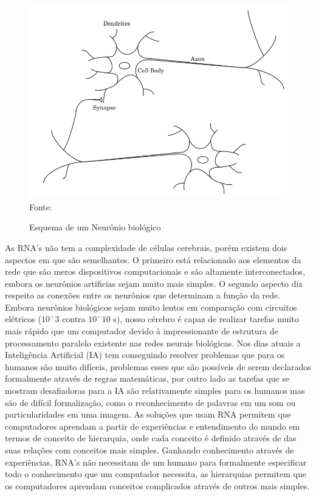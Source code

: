 \documentclass[
	12pt,				%
    oneside,			%
	a4paper,			%
	english,			%
	french,				%
	spanish,			%
	brazil,				%
	]{abntex2}
\begin{document}
\begin{figure}[h]
    \centering
    \caption{Esquema de um Neurônio biológico}
    \includegraphics[width=\textwidth]{Neuronio}
    Fonte: \hfill
    \label{fig:figuraneuronio}
\end{figure}

As RNA's não tem a complexidade de células cerebrais, porém existem dois aspectos em que são semelhantes. O primeiro está relacionado aos elementos da rede que são meros dispositivos computacionais e são altamente interconectados, embora os neurônios artificias sejam muito mais simples. O segundo aspecto diz respeito as conexões entre os neurônios que determinam a função da rede. Embora neurônios biológicos sejam muito lentos em comparação com circuitos elétricos ($10^-3$ contra $10^-10$ s), nosso cérebro é capaz de realizar tarefas muito mais rápido que um computador devido à impressionante de estrutura de processamento paralelo existente nas redes neurais biológicas. 
Nos dias atuais a Inteligência Artificial (IA) tem conseguindo resolver problemas que para os humanos são muito difíceis, problemas esses que são possíveis de serem declarados formalmente através de regras matemáticas, por outro lado as tarefas que se mostram desafiadoras para a IA são relativamente simples para os humanos mas são de difícil formalização, como o reconhecimento de palavras em um som ou particularidades em uma imagem. 
As soluções que usam RNA permitem que computadores aprendam a partir de experiências e entendimento do mundo em termos de conceito de hierarquia, onde cada conceito é definido através de das suas relações com conceitos mais simples. Ganhando conhecimento através de experiências, RNA's não necessitam de um humano para formalmente especificar todo o conhecimento que um computador necessita, as hierarquias permitem que os computadores aprendam conceitos complicados através de outros mais simples.
\end{document}
